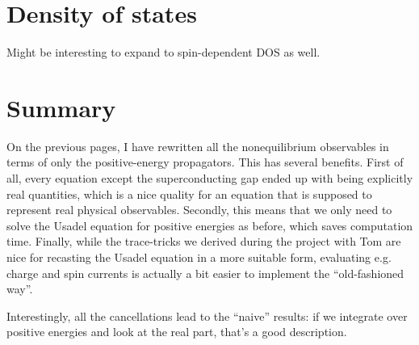 \clearpage
\section{Density of states}
Might be interesting to expand to spin-dependent DOS as well.

\clearpage
\section{Summary}
On the previous pages, I have rewritten all the nonequilibrium observables in terms of only the positive-energy propagators.
This has several benefits.
First of all, every equation except the superconducting gap ended up with being explicitly real quantities, which is a nice quality for an equation that is supposed to represent real physical observables.
Secondly, this means that we only need to solve the Usadel equation for positive energies as before, which saves computation time.
Finally, while the trace-tricks we derived during the project with Tom are nice for recasting the Usadel equation in a more suitable form, evaluating e.g. charge and spin currents is actually a bit easier to implement the ``old-fashioned way''.

Interestingly, all the cancellations lead to the ``naive'' results: if we integrate over positive energies and look at the real part, that's a good description.
